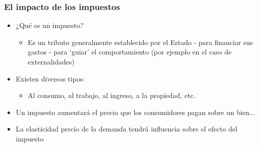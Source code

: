 \documentclass{beamer}
\begin{document}



\begin{frame}
\frametitle{El impacto de los impuestos}
\begin{itemize}
    \item ¿Qué es un impuesto?
    \begin{itemize}
        \item Es un tributo generalmente establecido por el Estado 
        - para financiar sus gastos
        - para ‘guiar’ el comportamiento (por ejemplo en el caso de externalidades)
    \end{itemize}
    \item Existen diversos tipos:
    \begin{itemize}
        \item Al consumo, al trabajo, al ingreso, a la propiedad, etc.
    \end{itemize}
    \item Un impuesto aumentará el precio que los consumidores pagan sobre un bien...
    \item La elasticidad precio de la demanda tendrá influencia sobre el efecto del impuesto
\end{itemize}
\end{frame}
\end{document}
